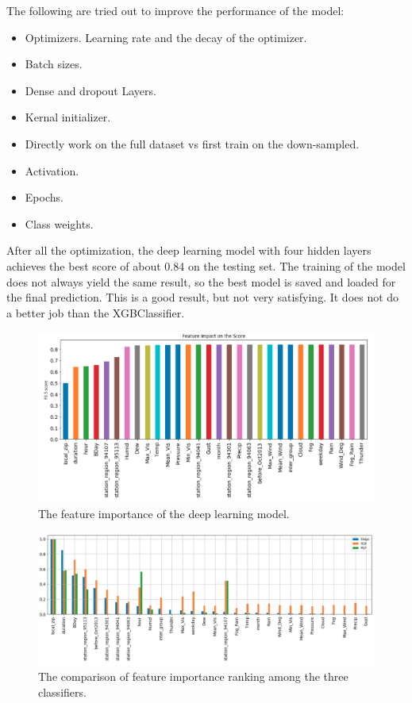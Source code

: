 \documentclass[a4paper]{article}
\begin{document}
			The following are tried out to improve the performance of the model:
			
			\begin{itemize}
				\item Optimizers. Learning rate and the decay of the optimizer.
				\item Batch sizes.
				\item Dense and dropout Layers.
				\item Kernal initializer.
				\item Directly work on the full dataset vs first train on the down-sampled.
				\item Activation.
				\item Epochs. 
				\item Class weights.
			\end{itemize}
						
			After all the optimization, the deep learning model with four hidden layers achieves the best score of about 0.84 on the testing set. The training of the model does not always yield the same result, so the best model is saved and loaded for the final prediction. This is a good result, but not very satisfying. It does not do a better job than the XGBClassifier.
			
			\begin{figure}
				\centering
				\includegraphics[width=1\textwidth]{DeepLearningImportance.png}
				\caption{\label{fig:deep_learning}The feature importance of the deep learning model.}	
			\end{figure}
			
			\begin{figure}
				\centering
				\includegraphics[width=1\textwidth]{CompareAll.png}
				\caption{\label{fig:compare_all}The comparison of feature importance ranking among the three classifiers.}	
			\end{figure}
			
\end{document}

